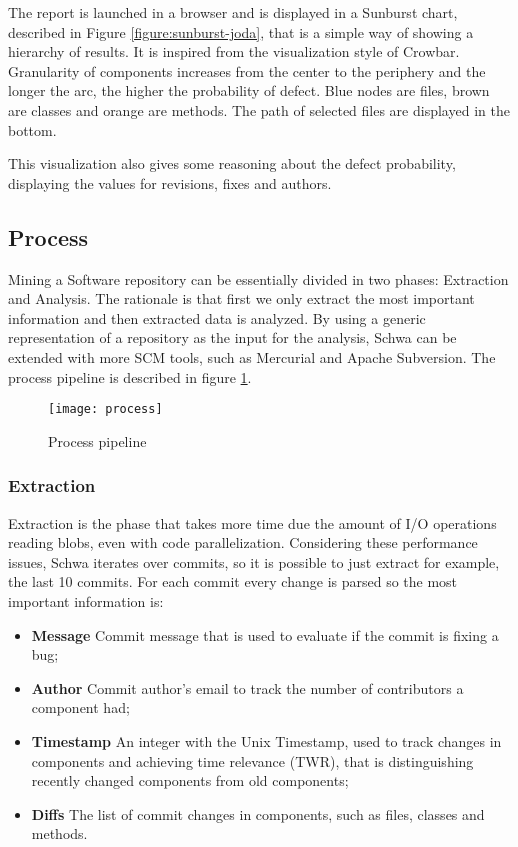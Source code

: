 The report is launched in a browser and is displayed in a Sunburst chart,
described in Figure \ref{figure:sunburst-joda}, that is a simple way of showing
a hierarchy of results. It is inspired from the visualization style of Crowbar.
Granularity of components increases from the center to the periphery and the
longer the arc, the higher the probability of defect. Blue nodes are files,
brown are classes and orange are methods. The path of selected files are
displayed in the bottom.

This visualization also gives some reasoning about the defect probability,
displaying the values for revisions, fixes and authors.

\subsection{Process}
Mining a Software repository can be essentially divided in two phases:
Extraction and Analysis. The rationale is that first we only extract the most
important information and then extracted data is analyzed. By using a generic
representation of a repository as the input for the analysis, Schwa can be
extended with more SCM tools, such as Mercurial and Apache Subversion. The
process pipeline is described in figure \ref{figure:schwa_process}.

\begin{figure}[H]
    \begin{center}
        \texttt{[image: process]}
        \caption{Process pipeline}
        \label{figure:schwa_process}
    \end{center}
\end{figure}

\subsubsection{Extraction}
Extraction is the phase that takes more time due the amount of I/O operations
reading blobs, even with code parallelization. Considering these performance
issues, Schwa iterates over commits, so it is possible to just extract for
example, the last 10 commits. For each commit every
change is parsed so the most important information is:

\begin{itemize}
\item  \textbf{Message} Commit message that is used to evaluate if the commit
is fixing a bug;
\item  \textbf{Author} Commit author's email to track the number of contributors
a component had;
\item  \textbf{Timestamp} An integer with the Unix Timestamp, used to track
changes in components and achieving time relevance (TWR), that is distinguishing
 recently changed components from old components;
\item  \textbf{Diffs} The list of commit changes in components, such as files,
classes and methods.
\end{itemize}

